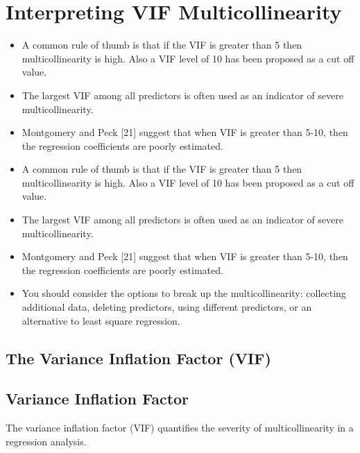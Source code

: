\documentclass[a4paper,12pt]{article}
\begin{document}

\section{Interpreting VIF Multicollinearity}

\begin{itemize}
\item  A common rule of thumb is that if the VIF is greater than 5 then multicollinearity is high. Also a VIF
level of 10 has been proposed as a cut off value.
\item  The largest VIF among all predictors is often used as an indicator of severe multicollinearity.
\item  Montgomery and Peck [21] suggest that when VIF is greater than 5-10, then the regression coefficients are poorly estimated.
\item A common rule of thumb is that if the VIF is greater than 5 then multicollinearity is high.
Also a VIF level of 10 has been proposed as a cut off value.
\item The largest VIF among all predictors is often used as an indicator of severe multicollinearity. 
\item Montgomery and Peck [21] suggest that when VIF is greater than 5-10, then the regression coefficients are poorly estimated. \item You should
consider the options to break up the multicollinearity: collecting additional data, deleting
predictors, using different predictors, or an alternative to least square regression.
\end{itemize}









\subsection{The Variance Inflation Factor (VIF)}





\subsection{Variance Inflation Factor}

The variance inflation factor (VIF) quantifies the severity of multicollinearity in a regression analysis.
\end{document}
